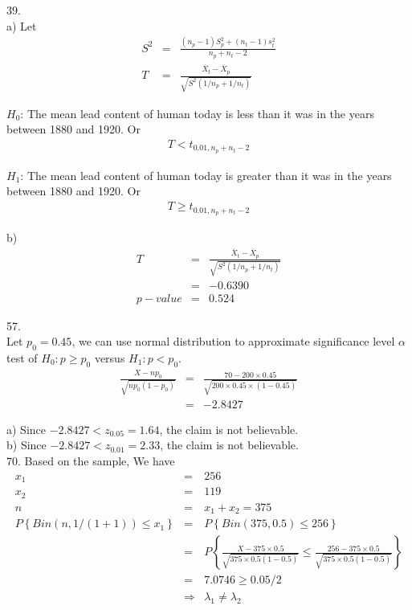 \documentclass[12pt]{article}
\begin{document}
39. \\
a) Let
\begin{eqnarray*}
  S^2 &=& \frac {(n_p - 1)S_p^2 + (n_t - 1)s_t^2}{n_p + n_t - 2} \\
  T   &=& \frac {\overline{X}_t - \overline{X}_p}
  {\sqrt{S^2(1/n_p + 1/n_t)}}
\end{eqnarray*}

$H_0$: The mean lead content of human today is less than it was in the years between 1880 and 1920. Or
\begin{eqnarray*}
  T < t_{0.01, n_p + n_t - 2}
\end{eqnarray*}

$H_1$: The mean lead content of human today is greater than it was in the years between 1880 and 1920. Or
\begin{eqnarray*}
  T \ge t_{0.01, n_p + n_t - 2}
\end{eqnarray*}

b)
\begin{eqnarray*}
  T
  &=& \frac {\overline{X}_t - \overline{X}_p}
  {\sqrt{S^2(1/n_p + 1/n_t)}} \\
  &=& -0.6390 \\
  p-value &=& 0.524
\end{eqnarray*}

57. \\

Let $p_0 = 0.45$, we can use normal distribution to approximate significance level $\alpha$ test of $H_0: p \ge p_0$ versus $H_1: p < p_0$.
\begin{eqnarray*}
  \frac{X - n p_0}{\sqrt{n p_0 (1 - p_0)}}
  &=& \frac {70 - 200 \times 0.45}
  {\sqrt{200 \times 0.45 \times (1 - 0.45)}} \\
  &=& -2.8427
\end{eqnarray*}

a) Since $-2.8427 < z_{0.05} = 1.64$, the claim is not believable. \\
b) Since $-2.8427 < z_{0.01} = 2.33$, the claim is not believable. \\

70. Based on the sample, We have
\begin{eqnarray*}
  x_1 &=& 256 \\
  x_2 &=& 119 \\
  n   &=& x_1 + x_2 = 375 \\
  P \left\{ Bin(n, 1/(1+1)) \le x_1 \right\}
  &=& P \left\{ Bin(375, 0.5) \le 256 \right\} \\
  &=& P \left\{ \frac{X - 375 \times 0.5}{\sqrt{375 \times 0.5 (1 - 0.5)}} 
    \le  \frac{256 - 375 \times 0.5}{\sqrt{375 \times 0.5 (1 - 0.5)}}
  \right\} \\
  &=& 7.0746 \ge 0.05/2 \\
  &\Rightarrow& \lambda_1 \neq \lambda_2
\end{eqnarray*}
\end{document}

